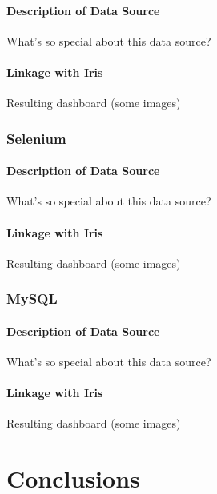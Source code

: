 \documentclass[12pt,a4paper,titlepage]{report}
\begin{document}
\subsubsection{Description of Data Source}
What's so special about this data source?
\subsubsection{Linkage with Iris}
Resulting dashboard (some images)

\subsection{Selenium}
\subsubsection{Description of Data Source}
What's so special about this data source?
\subsubsection{Linkage with Iris}
Resulting dashboard (some images)

\subsection{MySQL}
\subsubsection{Description of Data Source}
What's so special about this data source?
\subsubsection{Linkage with Iris}
Resulting dashboard (some images)

\chapter{Conclusions}



\nocite{*}
\printbibliography

\clearpage

\begin{appendices}

\end{appendices}
\end{document}
